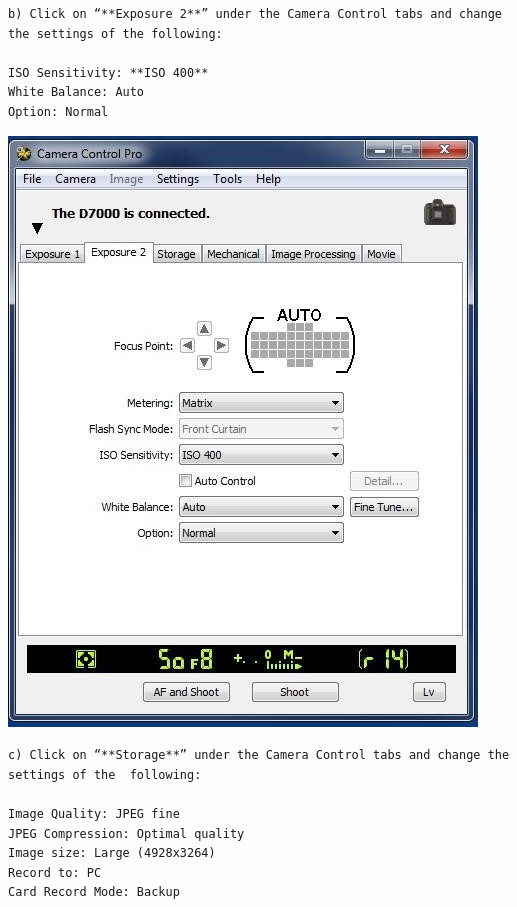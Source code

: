 \documentclass[]{book}
\begin{document}
\begin{verbatim}
b) Click on “**Exposure 2**” under the Camera Control tabs and change the settings of the following:  

ISO Sensitivity: **ISO 400**
White Balance: Auto
Option: Normal  
\end{verbatim}

\includegraphics{images/Camera4.jpg}

\begin{verbatim}
c) Click on “**Storage**” under the Camera Control tabs and change the settings of the  following:  

Image Quality: JPEG fine
JPEG Compression: Optimal quality
Image size: Large (4928x3264)
Record to: PC
Card Record Mode: Backup  
\end{verbatim}
\end{document}
